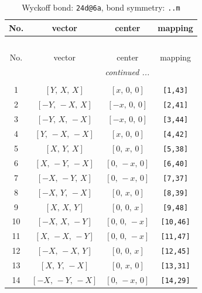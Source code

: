 \documentclass[fleqn,8pt]{jsarticle}
\begin{document}
\begin{longtable}{cccc}
\caption{Wyckoff bond: {\tt 24d@6a}, bond symmetry: {\tt ..m}}
 \\
 \hline \hline
No. & vector & center & mapping \\ \hline \endfirsthead

\multicolumn{3}{l}{\tablename\ \thetable{}} \\
 \hline \hline
No. & vector & center & mapping \\ \hline \endhead

 \hline \hline
\multicolumn{3}{r}{\footnotesize\it continued ...} \\ \endfoot

 \hline \hline
\multicolumn{3}{r}{} \\ \endlastfoot

1 & $\left[ Y,\, X,\, X \right]$ & $\left[ x,\, 0,\, 0 \right]$ & {\tt [1,43]} \\ \hline
2 & $\left[ - Y,\, - X,\, X \right]$ & $\left[ - x,\, 0,\, 0 \right]$ & {\tt [2,41]} \\ \hline
3 & $\left[ - Y,\, X,\, - X \right]$ & $\left[ - x,\, 0,\, 0 \right]$ & {\tt [3,44]} \\ \hline
4 & $\left[ Y,\, - X,\, - X \right]$ & $\left[ x,\, 0,\, 0 \right]$ & {\tt [4,42]} \\ \hline
5 & $\left[ X,\, Y,\, X \right]$ & $\left[ 0,\, x,\, 0 \right]$ & {\tt [5,38]} \\ \hline
6 & $\left[ X,\, - Y,\, - X \right]$ & $\left[ 0,\, - x,\, 0 \right]$ & {\tt [6,40]} \\ \hline
7 & $\left[ - X,\, - Y,\, X \right]$ & $\left[ 0,\, - x,\, 0 \right]$ & {\tt [7,37]} \\ \hline
8 & $\left[ - X,\, Y,\, - X \right]$ & $\left[ 0,\, x,\, 0 \right]$ & {\tt [8,39]} \\ \hline
9 & $\left[ X,\, X,\, Y \right]$ & $\left[ 0,\, 0,\, x \right]$ & {\tt [9,48]} \\ \hline
10 & $\left[ - X,\, X,\, - Y \right]$ & $\left[ 0,\, 0,\, - x \right]$ & {\tt [10,46]} \\ \hline
11 & $\left[ X,\, - X,\, - Y \right]$ & $\left[ 0,\, 0,\, - x \right]$ & {\tt [11,47]} \\ \hline
12 & $\left[ - X,\, - X,\, Y \right]$ & $\left[ 0,\, 0,\, x \right]$ & {\tt [12,45]} \\ \hline
13 & $\left[ X,\, Y,\, - X \right]$ & $\left[ 0,\, x,\, 0 \right]$ & {\tt [13,31]} \\ \hline
14 & $\left[ - X,\, - Y,\, - X \right]$ & $\left[ 0,\, - x,\, 0 \right]$ & {\tt [14,29]} \\ \hline

\end{longtable}
\end{document}
